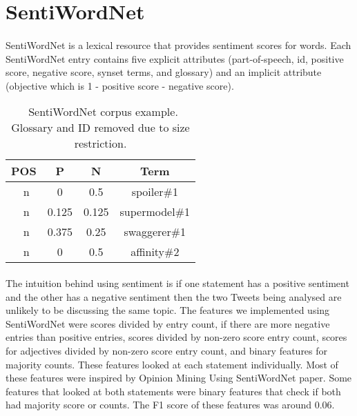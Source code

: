 \documentclass[11pt,letterpaper]{article}
\begin{document}
\section{SentiWordNet}
\paragraph{}
SentiWordNet is a lexical resource that provides sentiment scores for words. Each SentiWordNet entry contains five explicit attributes (part-of-speech, id, positive score, negative score, synset terms, and glossary) and an implicit attribute (objective which is 1 - positive score - negative score). 

\begin{table}
\begin{center}
\begin{tabularx}{183pt}{|c|c|c|c|}
\hline
\bf POS & \bf P & \bf N & \bf Term \\ 
\hline
\ n & 0 & 0.5 & spoiler\#1 \\
\ n & 0.125 & 0.125 & supermodel\#1 \\
\ n & 0.375 & 0.25 & swaggerer\#1 \\
\ n & 0 & 0.5 & affinity\#2 \\
\hline
\end{tabularx}
\end{center}
\caption{\label{sentiword-table} ~SentiWordNet corpus example. Glossary and ID removed due to size restriction. }
\end{table}

\paragraph{}
The intuition behind using sentiment is if one statement has a positive sentiment and the other has a negative sentiment then the two Tweets being analysed are unlikely to be discussing the same topic. The features we implemented using SentiWordNet were scores divided by entry count, if there are more negative entries than positive entries, scores divided by non-zero score entry count, scores for adjectives divided by non-zero score entry count, and binary features for majority counts. These features looked at each statement individually. Most of these features were inspired by Opinion Mining Using SentiWordNet paper. %
 Some features that looked at both statements were binary features that check if both had majority score or counts. The F1 score of these features was around 0.06.
\end{document}
